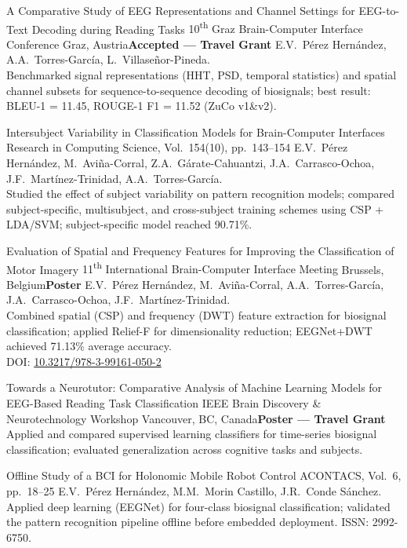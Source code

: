 \documentclass[11pt,a4paper,sans]{moderncv}
\begin{document}
  {A Comparative Study of EEG Representations and Channel Settings for EEG-to-Text Decoding during Reading Tasks}
  {10\textsuperscript{th} Graz Brain-Computer Interface Conference}
  {Graz, Austria}{\textbf{Accepted --- Travel Grant}}
  {E.V.\ P\'erez Hern\'andez, A.A.\ Torres-Garc\'ia, L.\ Villase\~nor-Pineda.\\
   Benchmarked signal representations (HHT, PSD, temporal statistics) and spatial channel subsets for sequence-to-sequence decoding of biosignals; best result: BLEU-1 = 11.45, ROUGE-1 F1 = 11.52 (ZuCo v1\&v2).}

  {Intersubject Variability in Classification Models for Brain-Computer Interfaces}
  {Research in Computing Science, Vol.\ 154(10), pp.\ 143--154}
  {}{}
  {E.V.\ P\'erez Hern\'andez, M.\ Avi\~na-Corral, Z.A.\ G\'arate-Cahuantzi, J.A.\ Carrasco-Ochoa, J.F.\ Mart\'inez-Trinidad, A.A.\ Torres-Garc\'ia.\\
   Studied the effect of subject variability on pattern recognition models; compared subject-specific, multisubject, and cross-subject training schemes using CSP + LDA/SVM; subject-specific model reached 90.71\%.}

  {Evaluation of Spatial and Frequency Features for Improving the Classification of Motor Imagery}
  {11\textsuperscript{th} International Brain-Computer Interface Meeting}
  {Brussels, Belgium}{\textbf{Poster}}
  {E.V.\ P\'erez Hern\'andez, M.\ Avi\~na-Corral, A.A.\ Torres-Garc\'ia, J.A.\ Carrasco-Ochoa, J.F.\ Mart\'inez-Trinidad.\\
   Combined spatial (CSP) and frequency (DWT) feature extraction for biosignal classification; applied Relief-F for dimensionality reduction; EEGNet+DWT achieved 71.13\% average accuracy.\\
   DOI: \href{https://doi.org/10.3217/978-3-99161-050-2}{10.3217/978-3-99161-050-2}}

  {Towards a Neurotutor: Comparative Analysis of Machine Learning Models for EEG-Based Reading Task Classification}
  {IEEE Brain Discovery \& Neurotechnology Workshop}
  {Vancouver, BC, Canada}{\textbf{Poster --- Travel Grant}}
  {Applied and compared supervised learning classifiers for time-series biosignal classification; evaluated generalization across cognitive tasks and subjects.}

  {Offline Study of a BCI for Holonomic Mobile Robot Control}
  {ACONTACS, Vol.\ 6, pp.\ 18--25}
  {}{}
  {E.V.\ P\'erez Hern\'andez, M.M.\ Morin Castillo, J.R.\ Conde S\'anchez.\\
   Applied deep learning (EEGNet) for four-class biosignal classification; validated the pattern recognition pipeline offline before embedded deployment. ISSN: 2992-6750.}
\end{document}

